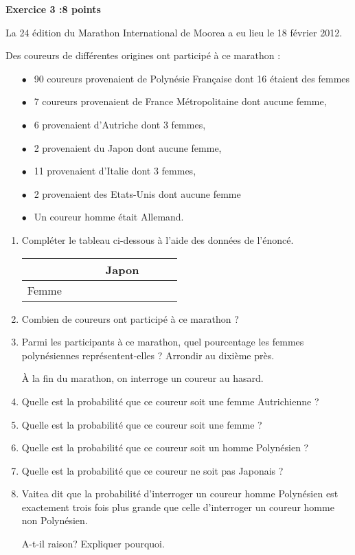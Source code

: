 \textbf{Exercice 3 :\hfill 8 points}

\medskip
 
La 24 édition du Marathon International de Moorea a eu lieu le 18 février 2012.
 
Des coureurs de différentes origines ont participé à ce marathon :

\setlength\parindent{6mm} 
\begin{itemize}
\item[$\bullet~~$] 90 coureurs provenaient de Polynésie Française dont 16 étaient des femmes 
\item[$\bullet~~$] 7 coureurs provenaient de France Métropolitaine dont aucune femme, 
\item[$\bullet~~$] 6 provenaient d'Autriche dont 3 femmes, 
\item[$\bullet~~$] 2 provenaient du Japon dont aucune femme, 
\item[$\bullet~~$] 11 provenaient d'Italie dont 3 femmes, 
\item[$\bullet~~$] 2 provenaient des Etats-Unis dont aucune femme 
\item[$\bullet~~$] Un coureur homme était Allemand.
\end{itemize}
\setlength\parindent{0mm}

\medskip
 
\begin{enumerate}
\item Compléter le tableau ci-dessous à l'aide des données de l'énoncé. 

\medskip
\begin{tabularx}{\linewidth}{|*{8}{>{\centering \arraybackslash}X|}}\cline{2-8}
\multicolumn{1}{c|}{~}	&	&	&	&Japon	&	&	&\\ \hline
Femme					&	&	&	&		&	&	&\\ \hline
\end{tabularx}
\medskip
 
\item Combien de coureurs ont participé à ce marathon ? 
\item Parmi les participants à ce marathon, quel pourcentage les femmes polynésiennes représentent-elles ? Arrondir au dixième près.
 
\hspace*{-1cm}À la fin du marathon, on interroge un coureur au hasard.
 
\item Quelle est la probabilité que ce coureur soit une femme Autrichienne ? 
\item Quelle est la probabilité que ce coureur soit une femme ? 
\item Quelle est la probabilité que ce coureur soit un homme Polynésien ? 
\item Quelle est la probabilité que ce coureur ne soit pas Japonais ? 
\item Vaitea dit que la probabilité d'interroger un coureur homme Polynésien est exactement trois fois plus grande que celle d'interroger un coureur homme non Polynésien.
 
A-t-il raison? Expliquer pourquoi. 
\end{enumerate}

\bigskip

